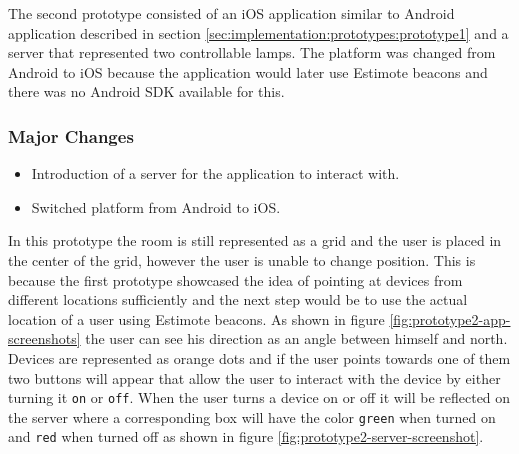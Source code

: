 The second prototype consisted of an iOS application similar to Android application described in section \ref{sec:implementation:prototypes:prototype1} and a server that represented two controllable lamps.
The platform was changed from Android to iOS because the application would later use Estimote beacons and there was no Android SDK available for this. 

\subsubsection*{Major Changes}
\begin{itemize}
\item Introduction of a server for the application to interact with.
\item Switched platform from Android to iOS.
\end{itemize}

In this prototype the room is still represented as a grid and the user is placed in the center of the grid, however the user is unable to change position.
This is because the first prototype showcased the idea of pointing at devices from different locations sufficiently and the next step would be to use the actual location of a user using Estimote beacons.
As shown in figure \ref{fig:prototype2-app-screenshots} the user can see his direction as an angle between himself and north.
Devices are represented as orange dots and if the user points towards one of them two buttons will appear that allow the user to interact with the device by either turning it \texttt{on} or \texttt{off}.
When the user turns a device on or off it will be reflected on the server where a corresponding box will have the color \texttt{green} when turned on and \texttt{red} when turned off as shown in figure \ref{fig:prototype2-server-screenshot}.

